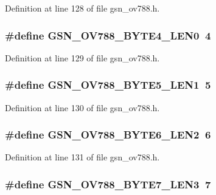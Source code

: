 Definition at line 128 of file gsn\_\-ov788.h.

\hypertarget{a00537_a8e05d473154cc480cf10794ecda8ecf5}{
\subsubsection[{GSN\_\-OV788\_\-BYTE4\_\-LEN0}]{\setlength{\rightskip}{0pt plus 5cm}\#define GSN\_\-OV788\_\-BYTE4\_\-LEN0~4}}
\label{a00537_a8e05d473154cc480cf10794ecda8ecf5}


Definition at line 129 of file gsn\_\-ov788.h.

\hypertarget{a00537_a0d5b5bdc4512e025e30a7c01472efe31}{
\subsubsection[{GSN\_\-OV788\_\-BYTE5\_\-LEN1}]{\setlength{\rightskip}{0pt plus 5cm}\#define GSN\_\-OV788\_\-BYTE5\_\-LEN1~5}}
\label{a00537_a0d5b5bdc4512e025e30a7c01472efe31}


Definition at line 130 of file gsn\_\-ov788.h.

\hypertarget{a00537_a9e51ee53b7b2ac998aa22793436b5c4c}{
\subsubsection[{GSN\_\-OV788\_\-BYTE6\_\-LEN2}]{\setlength{\rightskip}{0pt plus 5cm}\#define GSN\_\-OV788\_\-BYTE6\_\-LEN2~6}}
\label{a00537_a9e51ee53b7b2ac998aa22793436b5c4c}


Definition at line 131 of file gsn\_\-ov788.h.

\hypertarget{a00537_a620bfbde906f1a1960482e5bd1c65206}{
\subsubsection[{GSN\_\-OV788\_\-BYTE7\_\-LEN3}]{\setlength{\rightskip}{0pt plus 5cm}\#define GSN\_\-OV788\_\-BYTE7\_\-LEN3~7}}
\label{a00537_a620bfbde906f1a1960482e5bd1c65206}


